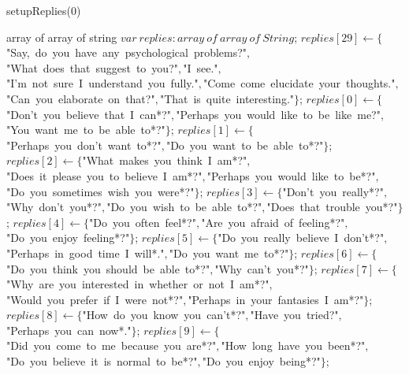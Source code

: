 \documentclass[a4paper,10pt]{article}
\begin{document}
\begin{algorithm}
\caption{setupReplies(0)}
\begin{algorithmic}[5]
\State {}
\State {}
\State {}
    \State array of array of string
  \EndDecl
  \State \(var\ replies:array\ of\ array\ of\ String\);
  \State {}
  \State {}
  \State \(replies[29]\gets\{\)"{}Say,\ do\ you\ have\ any\ psychological\ problems?"{}\(,\)"{}What\ does\ that\ suggest\ to\ you?"{}\(,\)"{}I\ see."{}\(,\)"{}I'{}m\ not\ sure\ I\ understand\ you\ fully."{}\(,\)"{}Come\ come\ elucidate\ your\ thoughts."{}\(,\)"{}Can\ you\ elaborate\ on\ that?"{}\(,\)"{}That\ is\ quite\ interesting."{}\(\}\);
  \State \(replies[0]\gets\{\)"{}Don'{}t\ you\ believe\ that\ I\ can*?"{}\(,\)"{}Perhaps\ you\ would\ like\ to\ be\ like\ me?"{}\(,\)"{}You\ want\ me\ to\ be\ able\ to*?"{}\(\}\);
  \State \(replies[1]\gets\{\)"{}Perhaps\ you\ don'{}t\ want\ to*?"{}\(,\)"{}Do\ you\ want\ to\ be\ able\ to*?"{}\(\}\);
  \State \(replies[2]\gets\{\)"{}What\ makes\ you\ think\ I\ am*?"{}\(,\)"{}Does\ it\ please\ you\ to\ believe\ I\ am*?"{}\(,\)"{}Perhaps\ you\ would\ like\ to\ be*?"{}\(,\)"{}Do\ you\ sometimes\ wish\ you\ were*?"{}\(\}\);
  \State \(replies[3]\gets\{\)"{}Don'{}t\ you\ really*?"{}\(,\)"{}Why\ don'{}t\ you*?"{}\(,\)"{}Do\ you\ wish\ to\ be\ able\ to*?"{}\(,\)"{}Does\ that\ trouble\ you*?"{}\(\}\);
  \State \(replies[4]\gets\{\)"{}Do\ you\ often\ feel*?"{}\(,\)"{}Are\ you\ afraid\ of\ feeling*?"{}\(,\)"{}Do\ you\ enjoy\ feeling*?"{}\(\}\);
  \State \(replies[5]\gets\{\)"{}Do\ you\ really\ believe\ I\ don'{}t*?"{}\(,\)"{}Perhaps\ in\ good\ time\ I\ will*."{}\(,\)"{}Do\ you\ want\ me\ to*?"{}\(\}\);
  \State \(replies[6]\gets\{\)"{}Do\ you\ think\ you\ should\ be\ able\ to*?"{}\(,\)"{}Why\ can'{}t\ you*?"{}\(\}\);
  \State \(replies[7]\gets\{\)"{}Why\ are\ you\ interested\ in\ whether\ or\ not\ I\ am*?"{}\(,\)"{}Would\ you\ prefer\ if\ I\ were\ not*?"{}\(,\)"{}Perhaps\ in\ your\ fantasies\ I\ am*?"{}\(\}\);
  \State \(replies[8]\gets\{\)"{}How\ do\ you\ know\ you\ can'{}t*?"{}\(,\)"{}Have\ you\ tried?"{}\(,\)"{}Perhaps\ you\ can\ now*."{}\(\}\);
  \State \(replies[9]\gets\{\)"{}Did\ you\ come\ to\ me\ because\ you\ are*?"{}\(,\)"{}How\ long\ have\ you\ been*?"{}\(,\)"{}Do\ you\ believe\ it\ is\ normal\ to\ be*?"{}\(,\)"{}Do\ you\ enjoy\ being*?"{}\(\}\);

\end{algorithmic}
\end{algorithm}
\end{document}
